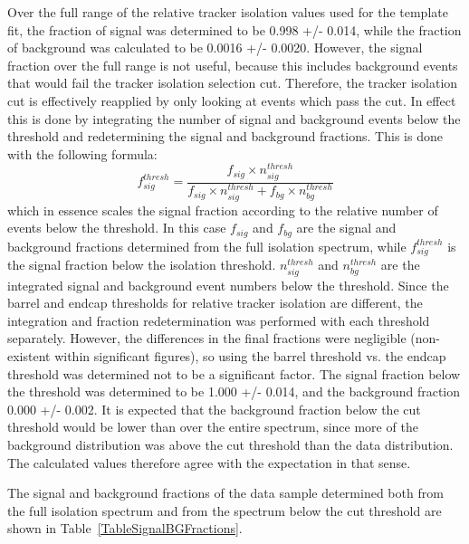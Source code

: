 Over the full range of the relative tracker isolation 
values used for the template fit, 
the fraction of signal was determined to be 
0.998 +/- 0.014, 
while the fraction of background was calculated to be 
0.0016 +/- 0.0020.  
However, the signal fraction over the full 
range is not useful, because this includes 
background events that would fail 
the tracker isolation selection cut.  
Therefore, the tracker isolation cut is effectively 
reapplied by only looking at events which 
pass the cut.  
In effect this is done by integrating 
the number of signal and background events 
below the threshold and redetermining the 
signal and background fractions.  
This is done with the following formula: 
\[
f_{sig}^{thresh} = \frac{ f_{sig} \times n_{sig}^{thresh} }{ f_{sig} \times n_{sig}^{thresh} + f_{bg} \times n_{bg}^{thresh} }
\]
which in essence scales the signal fraction 
according to the relative number of events 
below the threshold.  
In this case $f_{sig}$ and $f_{bg}$ are the 
signal and background fractions determined 
from the full isolation spectrum, 
while $f_{sig}^{thresh}$ is the signal fraction 
below the isolation threshold.  
$n_{sig}^{thresh}$ and $n_{bg}^{thresh}$ are the 
integrated signal and background event numbers 
below the threshold.  
Since the barrel and endcap thresholds 
for relative tracker isolation are different, 
the integration and fraction 
redetermination was performed with each 
threshold separately.  
However, the differences in the final fractions 
were negligible (non-existent within significant figures), 
so using the barrel threshold vs. the endcap threshold 
was determined not to be a significant factor.  
The signal fraction below the threshold was determined 
to be 1.000 +/- 0.014, and the background fraction 
0.000 +/- 0.002.  
It is expected that the background fraction below 
the cut threshold would be lower than over the 
entire spectrum, 
since more of the background distribution 
was above the cut threshold than the data distribution.  
The calculated values therefore agree with the 
expectation in that sense.  

The signal and background fractions of the data sample 
determined both from the full isolation spectrum and 
from the spectrum below the cut threshold are shown in 
Table~\ref{TableSignalBGFractions}.  

